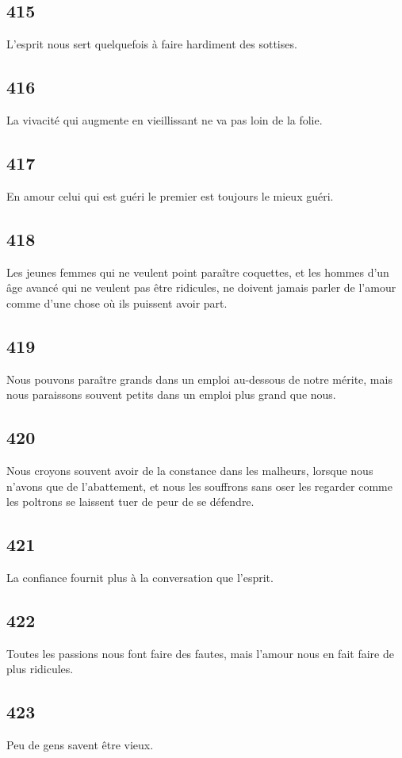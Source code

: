 \documentclass[french,twoside]{book} %
\begin{document}
\subsection[{415}]{ \textsc{415} }
\noindent L’esprit nous sert quelquefois à faire hardiment des sottises.
\subsection[{416}]{ \textsc{416} }
\noindent La vivacité qui augmente en vieillissant ne va pas loin de la folie.
\subsection[{417}]{ \textsc{417} }
\noindent En amour celui qui est guéri le premier est toujours le mieux guéri.
\subsection[{418}]{ \textsc{418} }
\noindent Les jeunes femmes qui ne veulent point paraître coquettes, et les hommes d’un âge avancé qui ne veulent pas être ridicules, ne doivent jamais parler de l’amour comme d’une chose où ils puissent avoir part.
\subsection[{419}]{ \textsc{419} }
\noindent Nous pouvons paraître grands dans un emploi au-dessous de notre mérite, mais nous paraissons souvent petits dans un emploi plus grand que nous.
\subsection[{420}]{ \textsc{420} }
\noindent Nous croyons souvent avoir de la constance dans les malheurs, lorsque nous n’avons que de l’abattement, et nous les souffrons sans oser les regarder comme les poltrons se laissent tuer de peur de se défendre.
\subsection[{421}]{ \textsc{421} }
\noindent La confiance fournit plus à la conversation que l’esprit.
\subsection[{422}]{ \textsc{422} }
\noindent Toutes les passions nous font faire des fautes, mais l’amour nous en fait faire de plus ridicules.
\subsection[{423}]{ \textsc{423} }
\noindent Peu de gens savent être vieux.
\end{document}
